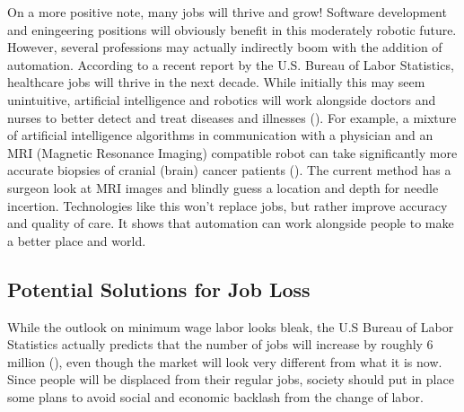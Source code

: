 On a more positive note, many jobs will thrive and grow! Software development and eningeering positions will obviously benefit in this moderately robotic future. However, several professions may actually indirectly boom with the addition of automation. According to a recent report by the U.S. Bureau of Labor Statistics, healthcare jobs will thrive in the next decade. While initially this may seem unintuitive, artificial intelligence and robotics will work alongside doctors and nurses to better detect and treat diseases and illnesses  (\cite{USBLS_JobsIn10Years}). For example, a mixture of artificial intelligence algorithms in communication with a physician and an MRI (Magnetic Resonance Imaging) compatible robot can take significantly more accurate biopsies of cranial (brain) cancer patients (\cite{Fischer_MRI_Robot}). The current method has a surgeon look at MRI images and blindly guess a location and depth for needle incertion. Technologies like this won't replace jobs, but rather improve accuracy and quality of care. It shows that automation can work alongside people to make a better place and world.

\subsection{Potential Solutions for Job Loss}

While the outlook on minimum wage labor looks bleak, the U.S Bureau of Labor Statistics actually predicts that the number of jobs will increase by roughly 6 million (\cite{USBLS_JobsIn10Years}), even though the market will look very different from what it is now. Since people will be displaced from their regular jobs, society should put in place some plans to avoid social and economic backlash from the change of labor.

